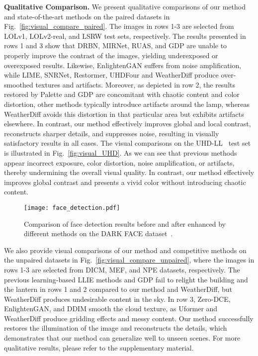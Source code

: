 \textbf{Qualitative Comparison.}
We present qualitative comparisons of our method and state-of-the-art methods on the paired datasets in Fig.~\ref{fig:visual_compare_paired}. The images in rows 1-3 are selected from LOLv1, LOLv2-real, and LSRW test sets, respectively. The results presented in rows 1 and 3 show that DRBN, MIRNet, RUAS, and GDP are unable to properly improve the contrast of the images, yielding underexposed or overexposed results. Likewise, EnlightenGAN suffers from noise amplification, while LIME, SNRNet, Restormer, UHDFour and WeatherDiff produce over-smoothed textures and artifacts. Moreover, as depicted in row 2, the results restored by Palette and GDP are concomitant with chaotic content and color distortion, other methods typically introduce artifacts around the lamp, whereas WeatherDiff avoids this distortion in that particular area but exhibits artifacts elsewhere. In contrast, our method effectively improves global and local contrast, reconstructs sharper details, and suppresses noise, resulting in visually satisfactory results in all cases. The visual comparisons on the UHD-LL~\cite{UHD_ICLR} test set is illustrated in Fig.~\ref{fig:visual_UHD}. As we can see that previous methods appear incorrect exposure, color distortion, noise amplification, or artifacts, thereby undermining the overall visual quality. In contrast, our method effectively improves global contrast and presents a vivid color without introducing chaotic content.
\begin{figure*}[!t]
	\centering
	\texttt{[image: face\_detection.pdf]}
	\caption{Comparison of face detection results before and after enhanced by different methods on the DARK FACE dataset~\cite{DarkFace}.}
	\label{fig:face_detection}
\end{figure*}

We also provide visual comparisons of our method and competitive methods on the unpaired datasets in Fig.~\ref{fig:visual_compare_unpaired}, where the images in rows 1-3 are selected from DICM, MEF, and NPE datasets, respectively. The previous learning-based LLIE methods and GDP fail to relight the building and the lantern in rows 1 and 2 compared to our method and WeatherDiff, but WeatherDiff produces undesirable content in the sky. In row 3, Zero-DCE, EnlightenGAN, and DDIM smooth the cloud texture, as Uformer and WeatherDiff produce gridding effects and messy content. Our method successfully restores the illumination of the image and reconstructs the details, which demonstrates that our method can generalize well to unseen scenes. For more qualitative results, please refer to the supplementary material.

